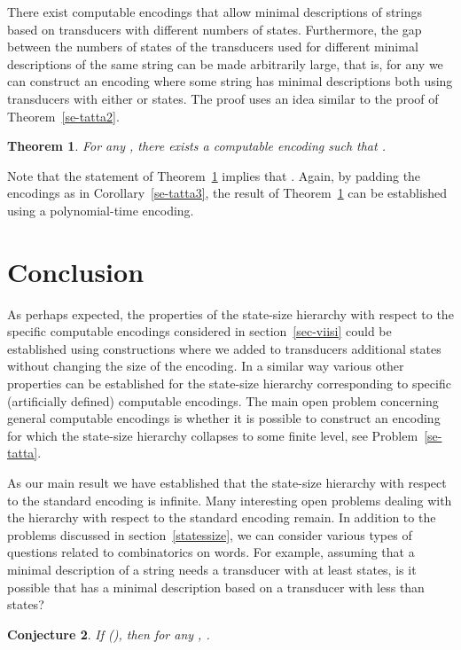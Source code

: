 \documentclass[copyright]{eptcs}
\newtheorem{theorem}{T\/heorem}[section]
\newtheorem{conjecture}[theorem]{Conjecture}
\begin{document}
There exist computable encodings that allow minimal descriptions of
strings based on transducers with different numbers of states.
Furthermore, the gap between the numbers of states of
the transducers used for different minimal descriptions
of the same string can be made arbitrarily
large, that is,
for any  we can construct an encoding where
some string has  minimal descriptions both using
transducers with either  or  states. 
The proof  uses an idea
similar to the proof of Theorem~\ref{se-tatta2}.


\begin{theorem}
\label{se-tatta4}
For any , there exists a computable encoding
 such that .
\end{theorem}

Note that the statement of Theorem~\ref{se-tatta4} implies that
.
Again, by padding the encodings as in Corollary~\ref{se-tatta3},
the result of Theorem~\ref{se-tatta4} can be established using
a polynomial-time encoding.

\section{Conclusion}

As perhaps expected, the properties of the state-size hierarchy
with respect to the specific  computable encodings considered
in section~\ref{sec-viisi} could be established
using constructions where we  added to transducers additional states
without changing the size of the encoding. 
In a similar way
various other properties can be established
for the state-size hierarchy corresponding 
to specific (artificially defined)
computable encodings. The main open problem concerning general
computable encodings is whether it is possible
to construct an encoding
for which the state-size hierarchy collapses
to some finite level, see Problem~\ref{se-tatta}.


As our main result we have established that the state-size hierarchy
with respect to the standard encoding is infinite.
Many interesting open problems dealing with the hierarchy
with respect to the standard encoding remain. In addition to the problems
discussed in section~\ref{statessize}, we can consider various types
of questions related to combinatorics on words. For example,
assuming that a minimal description of a string  needs a transducer
with at least  states, is it possible that  has a minimal
description based on a transducer with less than  states?

\begin{conjecture}
If  (), then for any ,
.
\end{conjecture}
\end{document}
